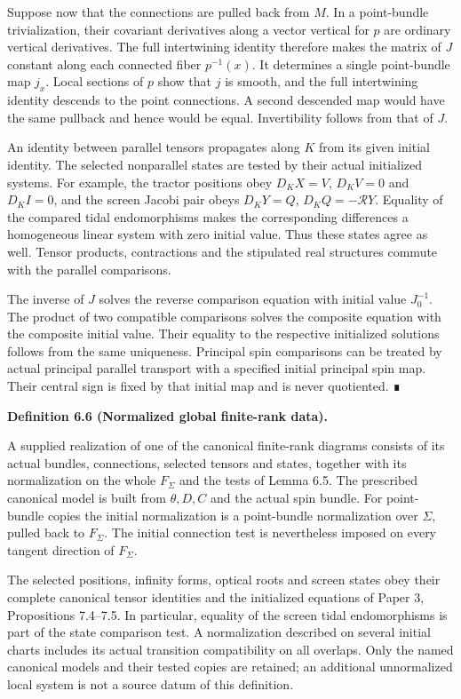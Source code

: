 \documentclass[
  english,
  11pt,
  reqno]{amsart}
\makeatletter
\newcommand{\pandocstatementheading}[1]{%
  \par\if@nobreak\else
    \addpenalty{\@beginparpenalty}%
    \addvspace{.5\baselineskip plus .2\baselineskip minus .2\baselineskip}%
  \fi
  {\normalfont\bfseries #1\par}%
  \nobreak\@afterindenttrue\@afterheading
}
\makeatother
\begin{document}
Suppose now that the connections are pulled back from \(M\). In a
point-bundle trivialization, their covariant derivatives along a vector
vertical for \(p\) are ordinary vertical derivatives. The full
intertwining identity therefore makes the matrix of \(J\) constant along
each connected fiber \(p^{-1}(x)\). It determines a single point-bundle
map \(j_x\). Local sections of \(p\) show that \(j\) is smooth, and the
full intertwining identity descends to the point connections. A second
descended map would have the same pullback and hence would be equal.
Invertibility follows from that of \(J\).

An identity between parallel tensors propagates along \(K\) from its
given initial identity. The selected nonparallel states are tested by
their actual initialized systems. For example, the tractor positions
obey \(D_KX=V\), \(D_KV=0\) and \(D_KI=0\), and the screen Jacobi pair
obeys \(D_KY=Q\), \(D_KQ=-\mathcal RY\). Equality of the compared tidal
endomorphisms makes the corresponding differences a homogeneous linear
system with zero initial value. Thus these states agree as well. Tensor
products, contractions and the stipulated real structures commute with
the parallel comparisons.

The inverse of \(J\) solves the reverse comparison equation with initial
value \(J_0^{-1}\). The product of two compatible comparisons solves the
composite equation with the composite initial value. Their equality to
the respective initialized solutions follows from the same uniqueness.
Principal spin comparisons can be treated by actual principal parallel
transport with a specified initial principal spin map. Their central
sign is fixed by that initial map and is never quotiented. ∎

\pandocstatementheading{\protect{}\label{def:global-normalized-finite-rank-data}Definition 6.6 (Normalized global finite-rank data).}

A supplied realization of one of the canonical finite-rank diagrams
consists of its actual bundles, connections, selected tensors and
states, together with its normalization on the whole \(F_\Sigma\) and
the tests of Lemma 6.5. The prescribed canonical model is built from
\(\theta,D,C\) and the actual spin bundle. For point-bundle copies the
initial normalization is a point-bundle normalization over \(\Sigma\),
pulled back to \(F_\Sigma\). The initial connection test is nevertheless
imposed on every tangent direction of \(F_\Sigma\).

The selected positions, infinity forms, optical roots and screen states
obey their complete canonical tensor identities and the initialized
equations of Paper 3, Propositions 7.4--7.5. In particular, equality of
the screen tidal endomorphisms is part of the state comparison test. A
normalization described on several initial charts includes its actual
transition compatibility on all overlaps. Only the named canonical
models and their tested copies are retained; an additional unnormalized
local system is not a source datum of this definition.
\end{document}
